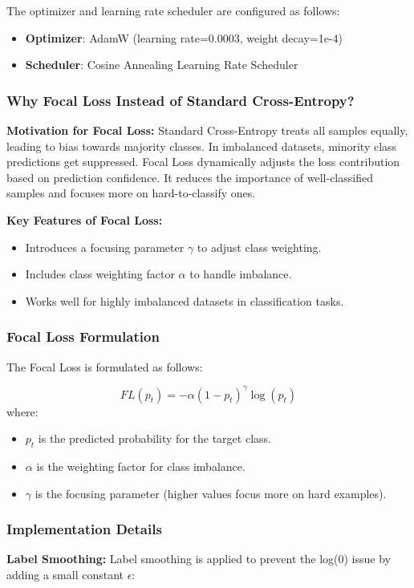 The optimizer and learning rate scheduler are configured as follows:
\begin{itemize}
    \item \textbf{Optimizer}: AdamW (learning rate=0.0003, weight decay=1e-4)
    \item \textbf{Scheduler}: Cosine Annealing Learning Rate Scheduler
\end{itemize}

\subsubsection{Why Focal Loss Instead of Standard Cross-Entropy?}
\textbf{Motivation for Focal Loss:}  
Standard Cross-Entropy treats all samples equally, leading to bias towards majority classes. In imbalanced datasets, minority class predictions get suppressed. Focal Loss dynamically adjusts the loss contribution based on prediction confidence. It reduces the importance of well-classified samples and focuses more on hard-to-classify ones.

\textbf{Key Features of Focal Loss:}
\begin{itemize}
    \item Introduces a focusing parameter $\gamma$ to adjust class weighting.
    \item Includes class weighting factor $\alpha$ to handle imbalance.
    \item Works well for highly imbalanced datasets in classification tasks.
\end{itemize}

\subsubsection{Focal Loss Formulation}
The Focal Loss is formulated as follows:

\[
FL(p_t) = -\alpha (1 - p_t)^{\gamma} \log(p_t)
\]
where:
\begin{itemize}
    \item $p_t$ is the predicted probability for the target class.
    \item $\alpha$ is the weighting factor for class imbalance.
    \item $\gamma$ is the focusing parameter (higher values focus more on hard examples).
\end{itemize}

\subsubsection{Implementation Details}
\textbf{Label Smoothing:} Label smoothing is applied to prevent the log(0) issue by adding a small constant $\epsilon$:

